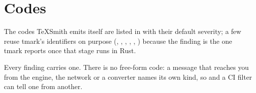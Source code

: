 \documentclass[a4paper,twoside]{article}
\begin{document}
\section{Codes}
The codes TeXSmith emits itself are listed in 
with their default severity; a few reuse tmark's identifiers on purpose
(, , ,
, , )
because the finding is the one tmark reports once that stage runs in Rust.

Every finding carries one. There is no free-form code: a message that reaches
you from the engine, the network or a converter names its own kind, so
 and a CI filter can tell one from another.
\end{document}

